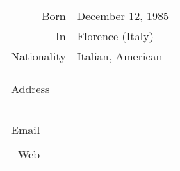 \documentclass[10pt]{article}
\begin{document}
{\Huge\name}

\vspace{20pt}

\begin{minipage}[t]{0.28\linewidth}
	\small
	\begin{tabular}{rl}
		{\color{lightgray}Born}	 	& December 12, 1985 \\
		{\color{lightgray}In}		& Florence (Italy) \\
		{\color{lightgray}Nationality}	& Italian, American \\
	\end{tabular}
\end{minipage}\hfill
\begin{minipage}[t]{0.3\linewidth}
	\small
	\begin{tabular}{rl}
		{\color{lightgray}Address} 	& \addressCO \\
   		 	                       	& \addressSTREET \\
        		                   	& \addressCITY \\
	\end{tabular}
\end{minipage}\hfill
\begin{minipage}[t]{0.32\linewidth}
	\small
	\begin{tabular}{rl}
		{\color{lightgray}Email} 	& \emailONE \\
									& \emailTWO \\
		{\color{lightgray}Web}		& \mywebpage
	\end{tabular}
\end{minipage}

\vspace{20pt}
\end{document}
